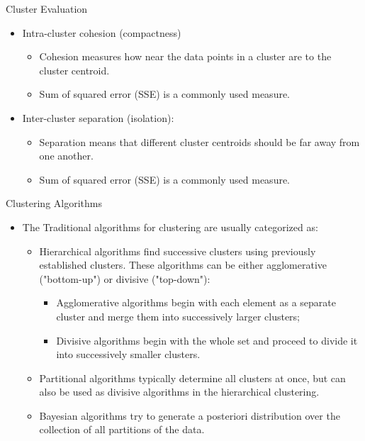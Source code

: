 \documentclass[serif, aspectratio=169]{beamer}
\begin{document}
\begin{frame}{Cluster Evaluation}
    \begin{itemize}
        \item Intra-cluster cohesion (compactness)
        \begin{itemize}
            \item Cohesion measures how near the data points in a cluster are to the cluster centroid.
            \item Sum of squared error (SSE) is a commonly used measure.
        \end{itemize}
        \item Inter-cluster separation (isolation):
        \begin{itemize}
            \item Separation means that different cluster centroids should be far away from one another.
            \item Sum of squared error (SSE) is a commonly used measure.
        \end{itemize}
    \end{itemize}
\end{frame}

\begin{frame}{Clustering Algorithms}
\begin{itemize}
    \item The Traditional algorithms for clustering are usually categorized as: 
    \begin{itemize}
        \item Hierarchical algorithms find successive clusters using previously established clusters. These algorithms can be either agglomerative ("bottom-up") or divisive ("top-down"):
\begin{itemize}
\item Agglomerative algorithms begin with each element as a separate cluster and merge them into successively larger clusters;
    \item Divisive algorithms begin with the whole set and proceed to divide it into successively smaller clusters.
\end{itemize}

\item  Partitional algorithms typically determine all clusters at once, but can also be used as divisive algorithms in the hierarchical clustering.

\item  Bayesian algorithms try to generate a posteriori distribution over the collection of all partitions of the data.

    \end{itemize}
\end{itemize}
\end{frame}
\end{document}
